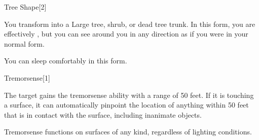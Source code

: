 \begin{spellsection}{Tree Shape}[2]
    \begin{spellheader}
    \end{spellheader}
    \begin{spellcontent}
        \begin{spelltargetinginfo}
        \end{spelltargetinginfo}
        \begin{spelleffects}
            \spelleffect You transform into a Large tree, shrub, or dead tree trunk. In this form, you are effectively \paralyzed, but you can see around you in any direction as if you were in your normal form.
            \spelldur \durext \dismissable
        \end{spelleffects}
    \end{spellcontent}
    \begin{spellfooter}
        \spellnotes You can sleep comfortably in this form.
        \miscastexplode
    \end{spellfooter}
\end{spellsection}

\begin{spellsection}{Tremorsense}[1]
    \begin{spellheader}
    \end{spellheader}
    \begin{spellcontent}
        \begin{spelltargetinginfo}
        \end{spelltargetinginfo}
        \begin{spelleffects}
            \spelleffect The target gains the tremorsense ability with a range of 50 feet. If it is touching a surface, it can automatically pinpoint the location of anything within 50 feet that is in contact with the surface, including inanimate objects.
            \spelldur \durpersonallong
        \end{spelleffects}
    \end{spellcontent}
    \begin{spellfooter}
        \spellnotes Tremorsense functions on surfaces of any kind, regardless of lighting conditions.
        \miscastexplode
    \end{spellfooter}
    \begin{spellaugments}
    \end{spellaugments}
\end{spellsection}

